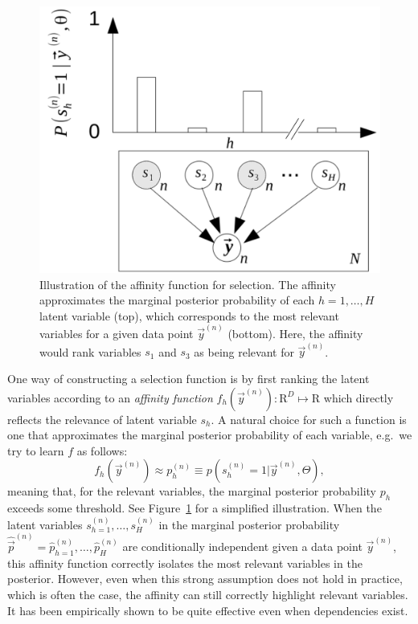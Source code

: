 \begin{figure}[h]
\begin{center}
\includegraphics[width=.35\textwidth]{figs/graph-affinity.pdf}
\caption{Illustration of the affinity function for selection.
The affinity approximates the marginal posterior probability of each $h=1,\dots,H$ latent variable (top), 
which corresponds to the most relevant variables for a given data point $\vec{y}^{(n)}$ (bottom). 
Here, the affinity would rank variables $s_1$ and $s_3$ as being relevant for $\vec{y}^{(n)}$.
}\label{fig:graph-affinity}
\end{center}
\end{figure}
%
One way of constructing a selection function %
is by first ranking the latent variables according to an 
\emph{affinity function} $f_h(\vec{y}^{(n)}) : \mathrm{R}^D \mapsto \mathrm{R}$ %
which directly reflects the relevance of latent variable $s_h$. 
%
A natural choice for such a function is one that approximates the marginal posterior probability 
of each variable, e.g.\ we try to learn $f$ as follows:
%
\begin{equation}
\label{eq:affinity}
f_h(\vec{y}^{(n)}) \approx p^{(n)}_h \equiv p(s^{(n)}_h = 1|\vec{y}^{(n)}, \Theta),
\end{equation}
%
meaning that, for the relevant variables, the marginal posterior probability $p_h$ 
exceeds some threshold. %
See Figure~\ref{fig:graph-affinity} for a simplified illustration. 
%
When the latent variables $s_{h=1}^{(n)}, \dots, s_H^{(n)}$ in the marginal posterior probability $\hat{\vec{p}}^{(n)} = \hat{p}_{h=1}^{(n)},\dots, \hat{p}_H^{(n)}$ are conditionally independent given a data point $\vec{y}^{(n)}$, this affinity function correctly isolates the most relevant variables in the posterior.
%
However, even when this strong assumption does not hold in practice, which is often the case, 
the affinity can still correctly highlight relevant variables.
It has been empirically shown to be quite effective even when dependencies exist.


